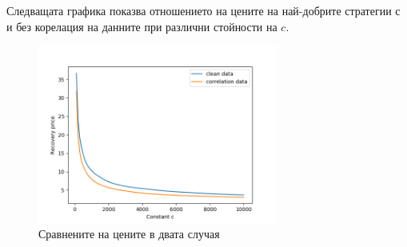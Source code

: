 \documentclass[11pt, a4paper]{article}
\theoremstyle{definition}
\begin{document}
		Следващата графика показва отношението на цените на най-добрите стратегии с и без корелация на данните при различни стойности на $c$.
		\begin{figure}[H]
			\begin{minipage}{1.0\textwidth}
				\centering
				\includegraphics[width=0.7\textwidth]{correlation_vs_clean.png}
				\caption{Сравнените на цените в двата случая}\label{Fig:Corr_vs_clean}
			\end{minipage}
		\end{figure}
\newpage	
\end{document}
